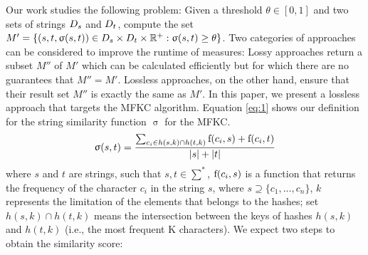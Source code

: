 Our work studies the following problem:
Given a threshold $\theta \in [0, 1]$ and two sets of strings
${D_s}{}$ and ${D_t}{}$, compute the set $M' = \{(s, t, \upsigma(s, t)) \in
{\ensuremath{D_s}}{} \times {\ensuremath{D_t}}{} \times \mathbb{R}^+ : \upsigma(s, t) \geq \theta\}$. 
Two categories of approaches can be considered to improve the runtime of measures: 
Lossy approaches return a subset $M''$ of $M'$ which can be calculated efficiently but for which there are no guarantees that $M'' = M'$. 
Lossless approaches, on the other hand, ensure that their result set $M''$ is exactly the same as $M'$.
In this paper, we present a lossless approach that targets the MFKC algorithm. 
Equation \ref{eq:1} shows our definition for the string similarity function $\upsigma$ for the MFKC.
\begin{equation} \label{eq:1}
	\upsigma(s,t)=
	\frac
	{\sum_{c_i \in h(s,k) \cap h(t,k)} \textnormal{f}(c_i,s)+\textnormal{f}(c_i,t)}
	{|s|+|t|}
\end{equation}
where $s$ and $t$ are strings, such that $s,t \in \sum^*$, $\textnormal{f}(c_i, s)$ is a function that returns the frequency of the character $c_i$ in the string $s$, where $s \supseteq \{c_1,...,c_n\}$, $k$ represents the limitation of the elements that belongs to the hashes; set $h(s,k) \cap h(t,k)$ means the intersection between the keys of hashes $h(s,k)$ and $h(t,k)$ (i.e., the most frequent K characters).
% 
We expect two steps to obtain the similarity score:
